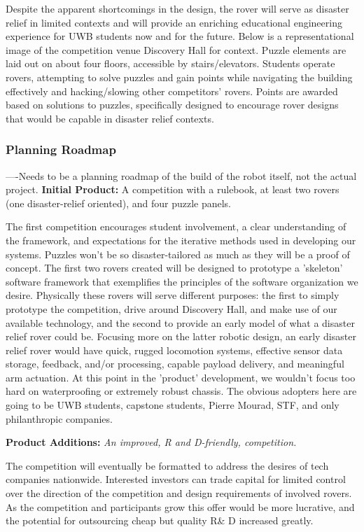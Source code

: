 \documentclass[a4paper, 10pt]{article}
\begin{document}
		Despite the apparent shortcomings in the design, the rover will serve as disaster relief in limited contexts and will provide an enriching educational engineering experience for UWB students now and for the future. Below is a representational image of the competition venue Discovery Hall for context. Puzzle elements are laid out on about four floors, accessible by stairs/elevators. Students operate rovers, attempting to solve puzzles and gain points while navigating the building effectively and hacking/slowing other competitors' rovers. Points are awarded based on solutions to puzzles, specifically designed to encourage rover designs that would be capable in disaster relief contexts.
	
		\subsubsection{Planning Roadmap}
		----Needs to be a planning roadmap of the build of the robot itself, not the actual project.
		\textbf{Initial Product:} A competition with a rulebook, at least two rovers (one disaster-relief oriented), and four puzzle panels.
		
		The first competition encourages student involvement, a clear understanding of the framework, and expectations for the iterative methods used in developing our systems. Puzzles won't be so disaster-tailored as much as they will be a proof of concept. The first two rovers created will be designed to prototype a 'skeleton' software framework that exemplifies the principles of the software organization we desire. Physically these rovers will serve different purposes: the first to simply prototype the competition, drive around Discovery Hall, and make use of our available technology, and the second to provide an early model of what a disaster relief rover could be. Focusing more on the latter robotic design, an early disaster relief rover would have quick, rugged locomotion systems, effective sensor data storage, feedback, and/or processing, capable payload delivery, and meaningful arm actuation. At this point in the 'product' development, we wouldn't focus too hard on waterproofing or extremely robust chassis. The obvious adopters here are going to be UWB students, capstone students, Pierre Mourad, STF, and only philanthropic companies.
		
		\textbf{Product Additions:} \emph{An improved, R and D-friendly, competition.}

	The competition will eventually be formatted to address the desires of tech companies nationwide. Interested investors can trade capital for limited control over the direction of the competition and design requirements of involved rovers. As the competition and participants grow this offer would be more lucrative, and the potential for outsourcing cheap but quality R\& D increased greatly.
\end{document}
